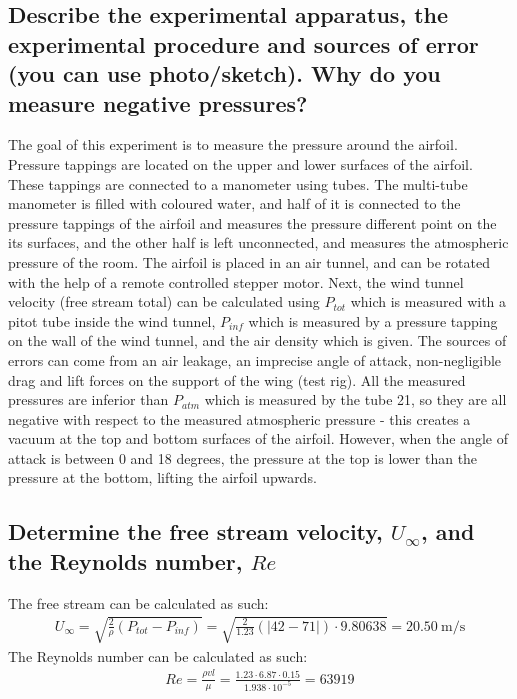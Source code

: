 \documentclass[11pt]{article}
\numberwithin{equation}{section}
\begin{document}
\subsection*{Describe the experimental apparatus, the experimental procedure and sources of error (you can use photo/sketch). Why do you measure negative pressures?}
The goal of this experiment is to measure the pressure around the airfoil. Pressure tappings are located on the upper and lower surfaces of the airfoil. These tappings are connected to a manometer using tubes. The multi-tube manometer is filled with coloured water, and half of it is connected to the pressure tappings of the airfoil and measures the pressure different point on the its surfaces, and the other half is left unconnected, and measures the atmospheric pressure of the room. The airfoil is placed in an air tunnel, and can be rotated with the help of a remote controlled stepper motor. Next, the wind tunnel velocity (free stream total) can be calculated using $P_{tot}$ which is measured with a pitot tube inside the wind tunnel, $P_{inf}$ which is measured by a pressure tapping on the wall of the wind tunnel, and the air density which is given. The sources of errors can come from an air leakage, an imprecise angle of attack, non-negligible drag and lift forces on the support of the wing (test rig). All the measured pressures are inferior than $P_{atm}$ which is measured by the tube 21, so they are all negative with respect to the measured atmospheric pressure - this creates a vacuum at the top and bottom surfaces of the airfoil. However, when the angle of attack is between 0 and 18 degrees, the pressure at the top is lower than the pressure at the bottom, lifting the airfoil upwards.
\subsection*{Determine the free stream velocity, $U_{\infty}$, and the Reynolds number, $Re$}
The free stream can be calculated as such:
\begin{align}
  U_{\infty} = \sqrt{\frac{2}{\rho}\left(P_{tot} - P_{inf}\right)} = \sqrt{\frac{2}{1.23}\left( \left| 42-71 \right| \right) \cdot 9.80638} = \SI{20.50}{\meter\per\second}
\end{align}
The Reynolds number can be calculated as such:
\begin{align}
  Re = \frac{\rho v l}{\mu} = \frac{1.23 \cdot 6.87 \cdot 0.15}{1.938\cdot 10^{-5}} = 63919
\end{align}
\end{document}
